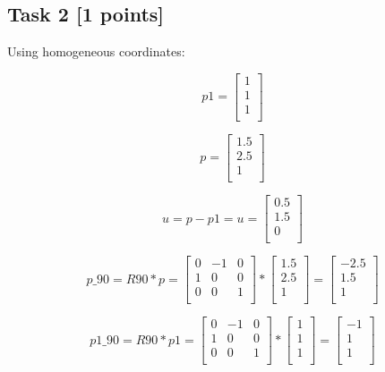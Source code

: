\documentclass{article}
\begin{document}
\subsection*{Task 2 [1 points]}
Using homogeneous coordinates:

\[
    p1 = \begin{bmatrix}
        1 \\
        1 \\
        1 \\
    \end{bmatrix}
\]

\[
    p = \begin{bmatrix}
        1.5 \\
        2.5 \\
        1   \\
    \end{bmatrix}
\]

\[
    u = p - p1 =
    u = \begin{bmatrix}
        0.5 \\
        1.5 \\
        0   \\
    \end{bmatrix}
\]

\[
    p\_90 = R90 * p =
    \begin{bmatrix}
        0 & -1 & 0 \\
        1 & 0  & 0 \\
        0 & 0  & 1 \\
    \end{bmatrix}
    *
    \begin{bmatrix}
        1.5 \\
        2.5 \\
        1   \\
    \end{bmatrix}
    =
    \begin{bmatrix}
        -2.5 \\
        1.5  \\
        1    \\
    \end{bmatrix}
\]


\[
    p1\_90 = R90 * p1 =
    \begin{bmatrix}
        0 & -1 & 0 \\
        1 & 0  & 0 \\
        0 & 0  & 1 \\
    \end{bmatrix}
    *
    \begin{bmatrix}
        1 \\
        1 \\
        1 \\
    \end{bmatrix}
    =
    \begin{bmatrix}
        -1 \\
        1  \\
        1  \\
    \end{bmatrix}
\]
\end{document}
